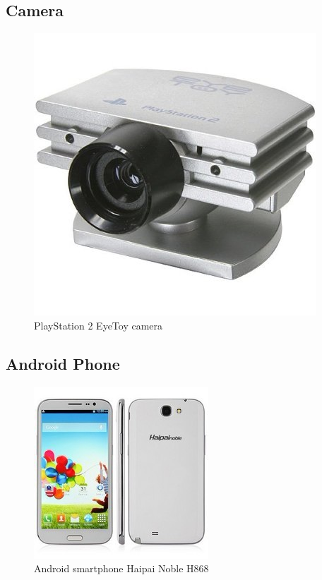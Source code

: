\subsection{Camera}

	\begin{figure}[H]
			\centering
			\includegraphics[scale=0.4]{images/ProjectComponents/camera.jpg}
			\caption{PlayStation 2 EyeToy camera }
			\label{}
	\end{figure}
	\bigskip


\subsection{Android Phone}

	\begin{figure}[H]
			\centering
			\includegraphics[scale=0.8]{images/ProjectComponents/android.jpg}
			\caption{Android smartphone Haipai Noble H868}
			\label{}
	\end{figure}
	\bigskip

